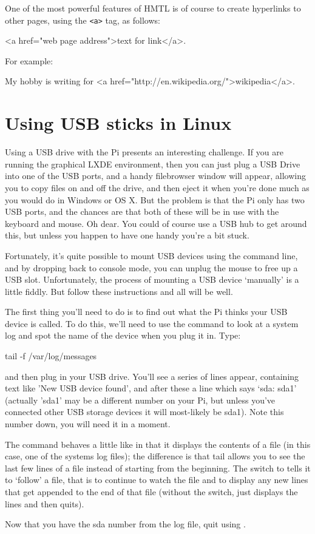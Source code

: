 One of the most powerful features of HMTL is of course to create hyperlinks to
other pages, using the \verb|<a>| tag, as follows:

\begin{ttoutenv}
<a href="web page address">text for link</a>.
\end{ttoutenv}

For example:

\begin{ttoutenv}
My hobby is writing for <a href="http://en.wikipedia.org/">wikipedia</a>.
\end{ttoutenv}

\section{Using USB sticks in Linux}
\label{appendix:usingUSB}

Using a USB drive with the Pi presents an interesting challenge. If you are running the graphical LXDE environment, then you can just plug a USB Drive into one of the USB ports, and a handy filebrowser window will appear, allowing you to copy files on and off the drive, and then eject it when you're done much as you would do in Windows or OS X. But the problem is that the Pi only has two USB ports, and the chances are that both of these will be in use with the keyboard and mouse. Oh dear. You could of course use a USB hub to get around this, but unless you happen to have one handy you're a bit stuck.

Fortunately, it's quite possible to mount USB devices using the command line, and by dropping back to console mode, you can unplug the mouse to free up a USB slot. Unfortunately, the process of mounting a USB device `manually' is a little fiddly. But follow these instructions and all will be well.

The first thing you'll need to do is to find out what the Pi thinks your USB device is called. To do this, we'll need to use the  command to look at a system log and spot the name of the device when you plug it in. Type:

\begin{ttoutenv}
tail -f /var/log/messages
\end{ttoutenv}

and then plug in your USB drive. You'll see a series of lines appear, containing text like 'New USB device found', and after these a line which says `sda: sda1' (actually 'sda1' may be a different number on your Pi, but unless you've connected other USB storage devices it will most-likely be sda1). Note this number down, you will need it in a moment.

The  command behaves a little like  in that it displays the contents of a file (in this case, one of the systems log files); the difference is that tail allows you to see the last few lines of a file instead of starting from the beginning. The  switch to  tells it to `follow' a file, that is to continue to watch the file and to display any new lines that get appended to the end of that file (without the switch,  just displays the lines and then quits).

Now that you have the sda number from the log file, quit  using .
